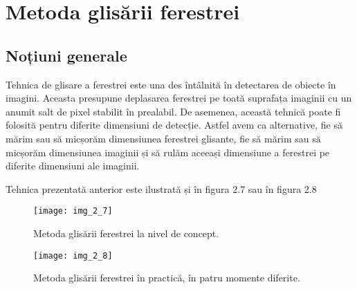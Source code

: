 \section{Metoda glisării ferestrei}

\subsection{Noțiuni generale}

Tehnica de glisare a ferestrei este una des întâlnită în detectarea de obiecte în imagini. Aceasta presupune deplasarea ferestrei pe toată suprafața imaginii cu un anumit salt de pixel stabilit în prealabil. De asemenea, această tehnică poate fi folosită pentru diferite dimensiuni de detecție. Astfel avem ca alternative, fie să mărim sau să micșorăm dimensiunea ferestrei glisante, fie să mărim sau să micșorăm dimensiunea imaginii și să rulăm aceeași dimensiune a ferestrei pe diferite dimensiuni ale imaginii.

Tehnica prezentată anterior este ilustrată și în figura 2.7 sau în figura 2.8
\begin{figure}[!h]
	\centering
	\texttt{[image: img\_2\_7]}
	\caption{Metoda glisării ferestrei la nivel de concept.}
	\label{fig:nonfloat}
\end{figure}
\begin{figure}[!h]
	\centering
	\texttt{[image: img\_2\_8]}
	\caption{Metoda glisării ferestrei în practică, în patru momente diferite.}
	\label{fig:nonfloat}
\end{figure}